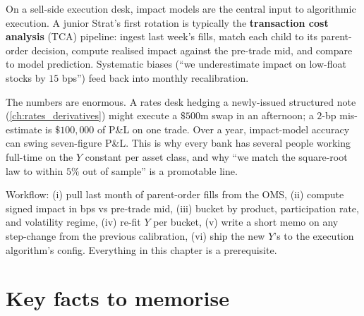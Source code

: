 \begin{gsbox}
On a sell-side execution desk, impact models are the central input
to algorithmic execution. A junior Strat's first rotation is
typically the \textbf{transaction cost analysis} (TCA) pipeline:
ingest last week's fills, match each child to its parent-order
decision, compute realised impact against the pre-trade mid, and
compare to model prediction. Systematic biases (``we underestimate
impact on low-float stocks by $15$ bps'') feed back into monthly
recalibration.

The numbers are enormous. A rates desk hedging a newly-issued
structured note (\cref{ch:rates_derivatives}) might execute a
$\$500$m swap in an afternoon; a $2$-bp mis-estimate is $\$100{,}000$
of P\&L on one trade. Over a year, impact-model accuracy can swing
seven-figure P\&L. This is why every bank has several people working
full-time on the $Y$ constant per asset class, and why ``we match
the square-root law to within $5\%$ out of sample'' is a promotable
line.

Workflow: (i) pull last month of parent-order fills from the OMS,
(ii) compute signed impact in bps vs pre-trade mid, (iii) bucket by
product, participation rate, and volatility regime, (iv) re-fit $Y$
per bucket, (v) write a short memo on any step-change from the
previous calibration, (vi) ship the new $Y$'s to the execution
algorithm's config. Everything in this chapter is a prerequisite.
\end{gsbox}

\section{Key facts to memorise}
\label{sec:ch6_keyfacts}

